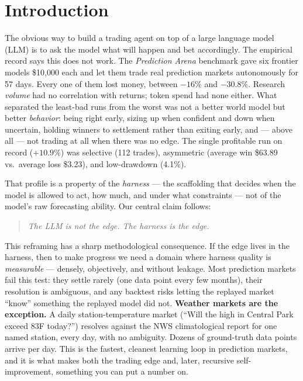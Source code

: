\documentclass[sigconf,review,anonymous]{acmart}
\begin{document}
\maketitle

\section{Introduction}

The obvious way to build a trading agent on top of a large language model (LLM)
is to ask the model what will happen and bet accordingly. The empirical record
says this does not work. The \emph{Prediction Arena} benchmark \cite{predarena}
gave six frontier models \$10{,}000 each and let them trade real prediction
markets autonomously for 57 days. Every one of them lost money, between $-16\%$
and $-30.8\%$. Research \emph{volume} had no correlation with returns; token
spend had none either. What separated the least-bad runs from the worst was not
a better world model but better \emph{behavior}: being right early, sizing up
when confident and down when uncertain, holding winners to settlement rather
than exiting early, and --- above all --- not trading at all when there was no
edge. The single profitable run on record ($+10.9\%$) was selective (112
trades), asymmetric (average win \$63.89 vs.\ average loss \$3.23), and
low-drawdown (4.1\%).

That profile is a property of the \emph{harness} --- the scaffolding that decides
when the model is allowed to act, how much, and under what constraints --- not of
the model's raw forecasting ability. Our central claim follows:

\begin{quote}
\emph{The LLM is not the edge. The harness is the edge.}
\end{quote}

This reframing has a sharp methodological consequence. If the edge lives in the
harness, then to make progress we need a domain where harness quality is
\emph{measurable} --- densely, objectively, and without leakage. Most prediction
markets fail this test: they settle rarely (one data point every few months),
their resolution is ambiguous, and any backtest risks letting the replayed market
``know'' something the replayed model did not. \textbf{Weather markets are the
exception.} A daily station-temperature market (``Will the high in Central Park
exceed 83\textdegree{}F today?'') resolves against the NWS climatological report
for one named station, every day, with no ambiguity. Dozens of ground-truth data
points arrive per day. This is the fastest, cleanest learning loop in prediction
markets, and it is what makes both the trading edge and, later, recursive
self-improvement, something you can put a number on.
\end{document}
